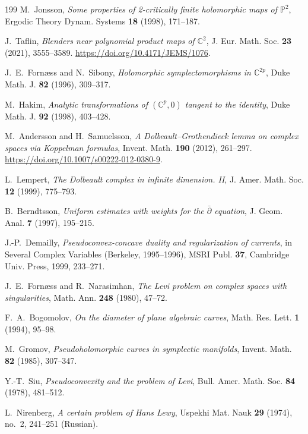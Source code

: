 \documentclass[11pt,reqno]{amsart}
\theoremstyle{definition}
\theoremstyle{remark}
\begin{document}
\begin{thebibliography}{199}
 M.~Jonsson, \emph{Some properties of 2-critically finite holomorphic maps of $\mathbb P^2$}, Ergodic Theory Dynam. Systems \textbf{18} (1998), 171--187.

 J.~Taflin, \emph{Blenders near polynomial product maps of $\mathbb C^2$}, J. Eur. Math. Soc. \textbf{23} (2021), 3555--3589. \url{https://doi.org/10.4171/JEMS/1076}.

 J.~E.~Forn\ae ss and N.~Sibony, \emph{Holomorphic symplectomorphisms in $\mathbb C^{2p}$}, Duke Math. J. \textbf{82} (1996), 309--317.

 M.~Hakim, \emph{Analytic transformations of $(\mathbb C^p,0)$ tangent to the identity}, Duke Math. J. \textbf{92} (1998), 403--428.

 M.~Andersson and H.~Samuelsson, \emph{A Dolbeault--Grothendieck lemma on complex spaces via Koppelman formulas}, Invent. Math. \textbf{190} (2012), 261--297. \url{https://doi.org/10.1007/s00222-012-0380-9}.

 L.~Lempert, \emph{The Dolbeault complex in infinite dimension. II}, J. Amer. Math. Soc. \textbf{12} (1999), 775--793.

 B.~Berndtsson, \emph{Uniform estimates with weights for the $\bar\partial$ equation}, J. Geom. Anal. \textbf{7} (1997), 195--215.

 J.-P.~Demailly, \emph{Pseudoconvex-concave duality and regularization of currents}, in Several Complex Variables (Berkeley, 1995--1996), MSRI Publ. \textbf{37}, Cambridge Univ. Press, 1999, 233--271.

 J.~E.~Forn\ae ss and R.~Narasimhan, \emph{The Levi problem on complex spaces with singularities}, Math. Ann. \textbf{248} (1980), 47--72.

 F.~A.~Bogomolov, \emph{On the diameter of plane algebraic curves}, Math. Res. Lett. \textbf{1} (1994), 95--98.

 M.~Gromov, \emph{Pseudoholomorphic curves in symplectic manifolds}, Invent. Math. \textbf{82} (1985), 307--347.

 Y.-T.~Siu, \emph{Pseudoconvexity and the problem of Levi}, Bull. Amer. Math. Soc. \textbf{84} (1978), 481--512.

 L.~Nirenberg, \emph{A certain problem of Hans Lewy}, Uspekhi Mat. Nauk \textbf{29} (1974), no.~2, 241--251 (Russian).


\end{thebibliography}
\end{document}
